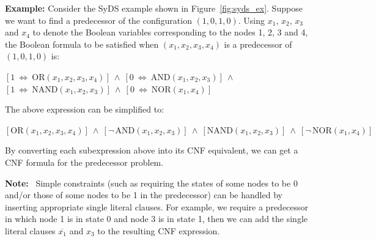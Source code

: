 \noindent
\textbf{Example:} Consider the SyDS example shown in Figure~\ref{fig:syds_ex}.
Suppose we want to find a predecessor of the configuration $(1, 0, 1, 0)$.
Using $x_1$, $x_2$, $x_3$ and $x_4$ to denote the Boolean variables corresponding
to the nodes 1, 2, 3 and 4, the Boolean formula to be satisfied when 
$(x_1, x_2, x_3, x_4)$ is a predecessor of $(1, 0, 1, 0)$ is:  

\medskip

\noindent
\hspace*{0.5in} $[1 ~\Leftrightarrow~ \mathrm{OR}(x_1, x_2, x_3, x_4)] ~\wedge~
[0 ~\Leftrightarrow~ \mathrm{AND}(x_1, x_2, x_3)] ~\wedge~ $\\
\hspace*{0.5in}
$[1 ~\Leftrightarrow~ \mathrm{NAND}(x_1, x_2, x_3)] ~\wedge~
[0 ~\Leftrightarrow~ \mathrm{NOR}(x_1, x_4)]$

\medskip

\noindent
The above expression can be simplified to:

\medskip

\noindent
\hspace*{0.5in} $[\mathrm{OR}(x_1, x_2, x_3, x_4)] ~\wedge~
[\neg\,\mathrm{AND}(x_1, x_2, x_3)] ~\wedge~ 
[\mathrm{NAND}(x_1, x_2, x_3)] ~\wedge~
[\neg\,\mathrm{NOR}(x_1, x_4)]$

\medskip

\noindent
By converting each subexpression above into its CNF equivalent, we can
get a CNF formula for the predecessor problem.

\medskip

\noindent
\textbf{Note:}~ Simple constraints (such as requiring
the states of some nodes to be 0 and/or those of some nodes to be 1
in the predecessor) can be handled by inserting appropriate 
single literal clauses.
For example, we require a predecessor in which node 1 is in state 0
and node 3 is in state 1, then we can add the single literal clauses
$\overline{x_1}$ and $x_3$ to the resulting CNF expression.
